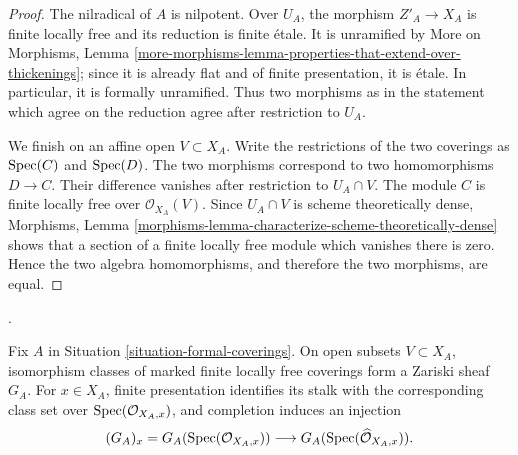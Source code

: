 \begin{proof}
The nilradical of $A$ is nilpotent. Over $U_A$, the morphism
$Z'_A \to X_A$ is finite locally free and its reduction is finite \'etale.
It is unramified by More on Morphisms, Lemma
\ref{more-morphisms-lemma-properties-that-extend-over-thickenings}; since it
is already flat and of finite presentation, it is \'etale. In particular, it
is formally unramified. Thus two morphisms as in the statement which agree on
the reduction agree after restriction to $U_A$.

We finish on an affine open $V \subset X_A$. Write the restrictions of the
two coverings as $\mathop{\mathrm{Spec}}(C)$ and $\mathop{\mathrm{Spec}}(D)$. The two morphisms correspond to
two homomorphisms $D \to C$. Their difference vanishes after restriction to
$U_A \cap V$. The module $C$ is finite locally free over
$\mathcal{O}_{X_A}(V)$. Since $U_A \cap V$ is scheme theoretically dense,
Morphisms, Lemma
\ref{morphisms-lemma-characterize-scheme-theoretically-dense} shows that a
section of a finite locally free module which vanishes there is zero. Hence
the two algebra homomorphisms, and therefore the two morphisms, are equal.
\end{proof}

\begin{lemma}
\label{lemma-formal-coverings-local-completion}
\begin{reference}
\cite[Expos\'e 195, C, Section 5, p. 388, and the 1962 erratum,
p. 301]{FGA}.
\end{reference}
Fix $A$ in Situation \ref{situation-formal-coverings}. On open subsets
$V \subset X_A$, isomorphism classes of marked finite locally free coverings
form a Zariski sheaf $G_A$. For $x \in X_A$, finite presentation identifies
its stalk with the corresponding class set over $\mathop{\mathrm{Spec}}(\mathcal{O}_{X_A,x})$,
and completion induces an injection
$$
(G_A)_x
= G_A(\mathop{\mathrm{Spec}}(\mathcal{O}_{X_A,x}))
\longrightarrow
G_A(\mathop{\mathrm{Spec}}(\widehat{\mathcal{O}}_{X_A,x})).
$$
\end{lemma}


